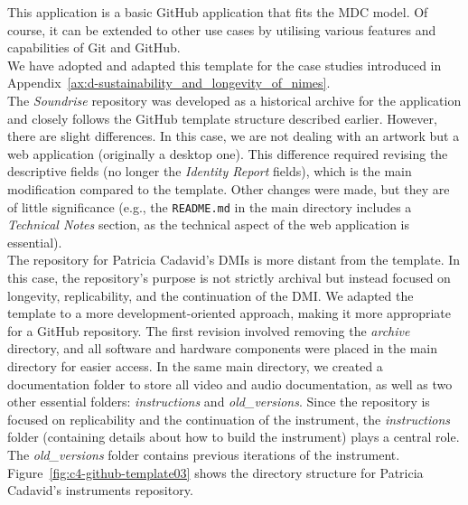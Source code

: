 \newline
This application is a basic GitHub application that fits the MDC model. Of course, it can be extended to other use cases by utilising various features and capabilities of Git and GitHub.\\
We have adopted and adapted this template for the case studies introduced in Appendix~\ref{ax:d-sustainability_and_longevity_of_nimes}.\\
The \textit{Soundrise} repository was developed as a historical archive for the application and closely follows the GitHub template structure described earlier. However, there are slight differences. In this case, we are not dealing with an artwork but a web application (originally a desktop one). This difference required revising the descriptive fields (no longer the \textit{Identity Report} fields), which is the main modification compared to the template. Other changes were made, but they are of little significance (e.g., the \texttt{README.md} in the main directory includes a \textit{Technical Notes} section, as the technical aspect of the web application is essential).\\
The repository for Patricia Cadavid’s DMIs is more distant from the template. In this case, the repository’s purpose is not strictly archival but instead focused on longevity, replicability, and the continuation of the DMI. We adapted the template to a more development-oriented approach, making it more appropriate for a GitHub repository. The first revision involved removing the \textit{archive} directory, and all software and hardware components were placed in the main directory for easier access. In the same main directory, we created a documentation folder to store all video and audio documentation, as well as two other essential folders: \textit{instructions} and \textit{old\_versions}. Since the repository is focused on replicability and the continuation of the instrument, the \textit{instructions} folder (containing details about how to build the instrument) plays a central role. The \textit{old\_versions} folder contains previous iterations of the instrument. Figure~\ref{fig:c4-github-template03} shows the directory structure for Patricia Cadavid’s instruments repository.

